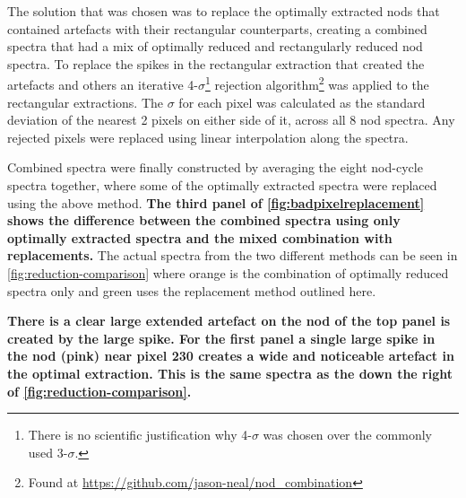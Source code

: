 The solution that was chosen was to replace the optimally extracted nods that contained artefacts with their rectangular counterparts, creating a combined spectra that had a mix of optimally reduced and rectangularly reduced nod spectra.
To replace the spikes in the rectangular extraction that created the artefacts and others an iterative 4-\(\sigma\)\footnote{There is no scientific justification why 4-\(\sigma\) was chosen over the commonly used 3-\(\sigma\).} rejection algorithm\footnote{Found at \url{https://github.com/jason-neal/nod_combination}} was applied to the rectangular extractions.
The \(\sigma\) for each pixel was calculated as the standard deviation of the nearest 2 pixels on either side of it, across all 8 nod spectra.
Any rejected pixels were replaced using linear interpolation along the spectra.


Combined spectra were finally constructed by averaging the eight nod-cycle spectra together, where some of the optimally extracted spectra were replaced using the above method. \textbf{The third panel of \cref{fig:badpixelreplacement} shows the difference between the combined spectra using only optimally extracted spectra and the mixed combination with replacements.} The actual spectra from the two different methods can be seen in \cref{fig:reduction-comparison} where orange is the combination of optimally reduced spectra only and green uses the replacement method outlined here.


\textbf{There is a clear large extended artefact on the  nod of the top panel is created by the large spike.
For the first panel a single large spike in the  nod (pink) near pixel 230 creates a wide and noticeable artefact in the optimal extraction.
This is the same spectra as the  down the right of \cref{fig:reduction-comparison}.
}

